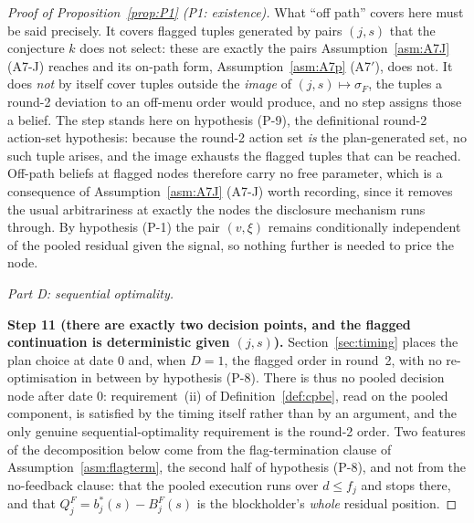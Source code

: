 \documentclass[11pt]{article}
\begin{document}
\begin{proof}[Proof of Proposition~\ref{prop:P1} (P1: existence)]
What ``off path'' covers here must be said precisely. It covers flagged tuples generated by pairs
$(j,s)$ that the conjecture $k$ does not select: these are exactly the pairs
Assumption~\ref{asm:A7J} (A7-J) reaches and its on-path form, Assumption~\ref{asm:A7p} (A7$'$), does not. It does
\emph{not} by itself cover tuples outside the \emph{image} of $(j,s) \mapsto \sigma_F$, the tuples a
round-2 deviation to an off-menu order would produce, and no step assigns those a belief. The step
stands here on hypothesis (P-9), the definitional round-2 action-set hypothesis: because the round-2
action set \emph{is} the plan-generated set, no such tuple arises, and the image exhausts the flagged
tuples that can be reached. Off-path beliefs at flagged nodes therefore carry no free parameter,
which is a consequence of Assumption~\ref{asm:A7J} (A7-J) worth recording, since it removes the usual
arbitrariness at exactly the nodes the disclosure mechanism runs through. By hypothesis (P-1) the
pair $(v,\xi)$ remains conditionally independent of the pooled residual given the signal, so nothing
further is needed to price the node.

\medskip
\noindent\emph{Part D: sequential optimality.}

\smallskip
\noindent\textbf{Step 11 (there are exactly two decision points, and the flagged continuation is
deterministic given $(j,s)$).}
Section~\ref{sec:timing} places the plan choice at date $0$ and, when $D = 1$, the flagged order in
round~2, with no re-optimisation in between by hypothesis (P-8). There is thus no pooled decision
node after date $0$: requirement~(ii) of Definition~\ref{def:cpbe}, read on the pooled component, is
satisfied by the timing itself rather than by an argument, and the only genuine sequential-optimality
requirement is the round-2 order. Two features of the decomposition below come from the
flag-termination clause of Assumption~\ref{asm:flagterm}, the second half of hypothesis (P-8), and
not from the no-feedback clause: that the pooled execution runs over $d \le f_j$ and stops there, and
that $Q_j^F = b_j^*(s)-B_j^F(s)$ is the blockholder's \emph{whole} residual position.


\end{proof}
\end{document}
